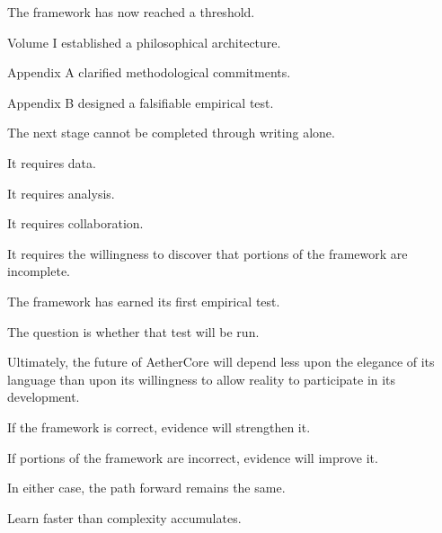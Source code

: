 \documentclass[12pt]{article}
\begin{document}
The framework has now reached a threshold.

Volume I established a philosophical architecture.

Appendix A clarified methodological commitments.

Appendix B designed a falsifiable empirical test.

The next stage cannot be completed through writing alone.

It requires data.

It requires analysis.

It requires collaboration.

It requires the willingness to discover that portions of the framework are incomplete.

The framework has earned its first empirical test.

The question is whether that test will be run.

Ultimately, the future of AetherCore will depend less upon the elegance of its language than upon its willingness to allow reality to participate in its development.

If the framework is correct, evidence will strengthen it.

If portions of the framework are incorrect, evidence will improve it.

In either case, the path forward remains the same.

Learn faster than complexity accumulates.
\end{document}
